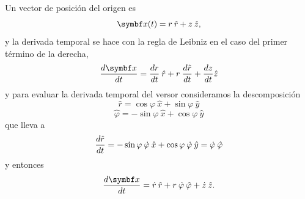 \documentclass[10pt,oneside]{CBFT_book}
\begin{document}
Un vector de posición del origen es 
\[
	\vb{x}(t) = r \:\hat{r} + z \:\hat{z},
\]
y la derivada temporal se hace con la regla de Leibniz en el caso del primer término de la derecha, 
\[
	\dtot{\vb{x}}{t} = \dtot{r}{t} \:\hat{r} + r \:\dtot{\hat{r}}{t} + \dtot{z}{t} \hat{z}
\]
y para evaluar la derivada temporal del versor consideramos la descomposición 
\[
	\hat{r} = \cos \varphi \:\hat{x} + \sin \varphi \:\hat{y}
\]
\[
	\hat{\varphi} = -\sin \varphi  \:\hat{x} + \cos  \varphi \:\hat{y}
\]
que lleva a 
\[
	\frac{d^{\hspace{-0.05em}} {\hat{r}}}{d {t}^{\hspace{-0.05em}}} = - \sin \varphi \: \dot{ \varphi } \:\hat{x} + \cos \varphi \: \dot{ \varphi } \:\hat{y} =
	\dot{\varphi} \: \hat{\varphi}
\]
y entonces 
\[
	\dtot{\vb{x}}{t} = \dot{r} \:\hat{r } + r \:\dot{\vp} \: \hat{\vp} + \dot{z} \:\hat{z}.
\]

\end{document}
